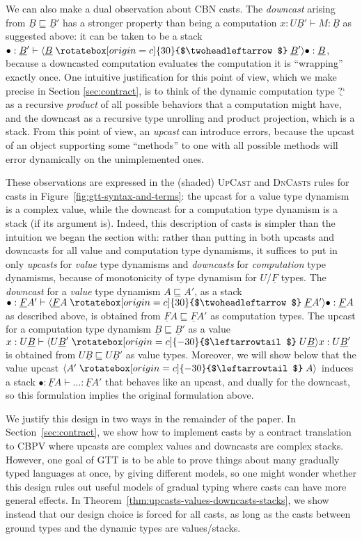 \documentclass[acmsmall,screen,12pt]{acmart}
\renewcommand{\u}{\underline}
\newcommand{\ltdyn}{\sqsubseteq}
\newcommand{\dync}{\u {\text{?`}}}
\newcommand{\uarrow}{\mathrel{\rotatebox[origin=c]{-30}{$\leftarrowtail$}}}
\newcommand{\darrow}{\mathrel{\rotatebox[origin=c]{30}{$\twoheadleftarrow$}}}
\newcommand{\upcast}[2]{\langle{#2}\uarrow{#1}\rangle}
\newcommand{\dncast}[2]{\langle{#1}\darrow{#2}\rangle}
\begin{document}
We can also make a dual observation about CBN casts.  The
\emph{downcast} arising from $\u B \ltdyn \u B'$ has a stronger property
than being a computation $x : U \u B' \vdash M : \u B$ as suggested
above: it can be taken to be a stack $\bullet : \u B' \vdash \dncast{\u
  B}{\u B'}{\bullet} : \u B$, because a downcasted computation
evaluates the computation it is ``wrapping'' exactly once.  One
intuitive justification for this point of view, which we make precise
in Section \ref{sec:contract}, is to think of the dynamic computation type $\dync$ as a
recursive \emph{product} of all possible behaviors that a computation
might have, and the downcast as a recursive type unrolling and product
projection, which is a stack.  From this point of view, an \emph{upcast}
can introduce errors, because the upcast of an object supporting some
``methods'' to one with all possible methods will error dynamically on
the unimplemented ones.

These observations are expressed in the (shaded) \textsc{UpCast} and
\textsc{DnCasts} rules for casts in
Figure~\ref{fig:gtt-syntax-and-terms}: the upcast for a value type
dynamism is a complex value, while the downcast for a computation type
dynamism is a stack (if its argument is).  Indeed, this description of
casts is simpler than the intuition we began the section with: rather
than putting in both upcasts and downcasts for all value and computation
type dynamisms, it suffices to put in only \emph{upcasts} for
\emph{value} type dynamisms and \emph{downcasts} for \emph{computation}
type dynamisms, because of monotonicity of type dynamism for $U$/$\u F$
types.  The \emph{downcast} for a \emph{value} type dynamism $A \ltdyn
A'$, as a stack $\bullet : \u F A' \vdash \dncast{\u F A}{\u F
  A'}{\bullet} : \u F A$ as described above, is obtained from $\u F A
\ltdyn \u F A'$ as computation types.  The upcast for a computation type
dynamism $\u B \ltdyn \u B'$ as a value $x : U \u B \vdash \upcast{U \u
  B}{U \u B'}{x} : U \u B'$ is obtained from $U \u B \ltdyn U \u B'$ as
value types.  Moreover, we will show below that the value upcast
$\upcast{A}{A'}$ induces a stack $\bullet : \u F A \vdash \ldots : \u F
A'$ that behaves like an upcast, and dually for the downcast, so this
formulation implies the original formulation above.

We justify this design in two ways in the remainder of the paper.  In
Section~\ref{sec:contract}, we show how to implement casts by a
contract translation to CBPV where upcasts are complex values and
downcasts are complex stacks.
%
However, one goal of
GTT is to be able to prove things about many gradually typed languages
at once, by giving different models, so one might wonder whether this
design rules out useful models of gradual typing where casts can have more general effects.  In
Theorem~\ref{thm:upcasts-values-downcasts-stacks}, we show instead that
our design choice is forced for all casts, as long as the casts between ground types and the dynamic types are values/stacks.
\end{document}
